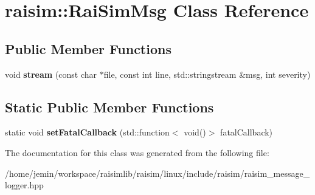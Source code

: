 \hypertarget{classraisim_1_1RaiSimMsg}{}\section{raisim\+:\+:Rai\+Sim\+Msg Class Reference}
\label{classraisim_1_1RaiSimMsg}
\subsection*{Public Member Functions}
\begin{DoxyCompactItemize}
\item 
\mbox{\label{classraisim_1_1RaiSimMsg_a455306245a5c10cdf5b1796ca315c192}} 
void {\bfseries stream} (const char $\ast$file, const int line, std\+::stringstream \&msg, int severity)
\end{DoxyCompactItemize}
\subsection*{Static Public Member Functions}
\begin{DoxyCompactItemize}
\item 
\mbox{\label{classraisim_1_1RaiSimMsg_aad8729931c85994ce37f1544193090b1}} 
static void {\bfseries set\+Fatal\+Callback} (std\+::function$<$ void()$>$ fatal\+Callback)
\end{DoxyCompactItemize}


The documentation for this class was generated from the following file\+:\begin{DoxyCompactItemize}
\item 
/home/jemin/workspace/raisimlib/raisim/linux/include/raisim/raisim\+\_\+message\+\_\+logger.\+hpp\end{DoxyCompactItemize}
